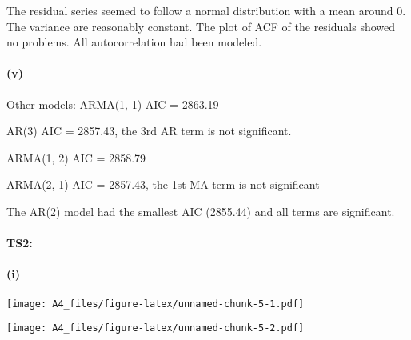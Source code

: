 \documentclass[]{article}
\newenvironment{Shaded}{\begin{snugshade}}{\end{snugshade}}
\newcommand{\DataTypeTok}[1]{\textcolor[rgb]{0.13,0.29,0.53}{#1}}
\newcommand{\KeywordTok}[1]{\textcolor[rgb]{0.13,0.29,0.53}{\textbf{#1}}}
\newcommand{\NormalTok}[1]{#1}
\newcommand{\OperatorTok}[1]{\textcolor[rgb]{0.81,0.36,0.00}{\textbf{#1}}}
\newcommand{\StringTok}[1]{\textcolor[rgb]{0.31,0.60,0.02}{#1}}
\let\oldparagraph\paragraph
\renewcommand{\paragraph}[1]{\oldparagraph{#1}\mbox{}}
\begin{document}
The residual series seemed to follow a normal distribution with a mean
around 0. The variance are reasonably constant. The plot of ACF of the
residuals showed no problems. All autocorrelation had been modeled.

\hypertarget{v}{%
\paragraph{(v)}\label{v}}

Other models: ARMA(1, 1) AIC = 2863.19

AR(3) AIC = 2857.43, the 3rd AR term is not significant.

ARMA(1, 2) AIC = 2858.79

ARMA(2, 1) AIC = 2857.43, the 1st MA term is not significant

The AR(2) model had the smallest AIC (2855.44) and all terms are
significant.

\hypertarget{ts2}{%
\paragraph{TS2:}\label{ts2}}

\hypertarget{i-1}{%
\paragraph{(i)}\label{i-1}}

\begin{Shaded}
\end{Shaded}

\texttt{[image: A4\_files/figure-latex/unnamed-chunk-5-1.pdf]}

\begin{Shaded}
\end{Shaded}

\texttt{[image: A4\_files/figure-latex/unnamed-chunk-5-2.pdf]}

\begin{Shaded}
\end{Shaded}
\end{document}
